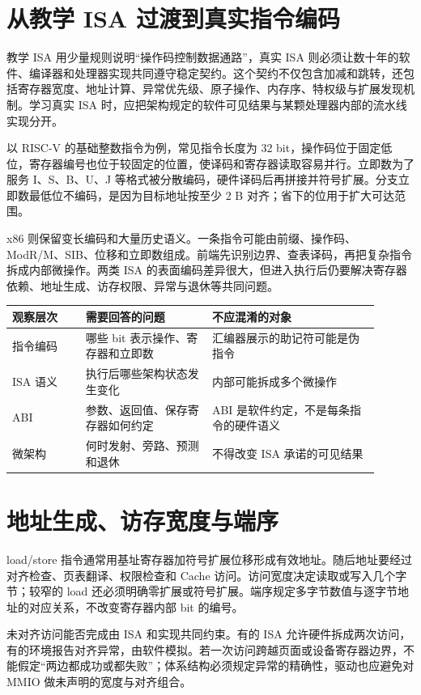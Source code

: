 \section{从教学 ISA 过渡到真实指令编码}

教学 ISA 用少量规则说明“操作码控制数据通路”，真实 ISA 则必须让数十年的软件、编译器和处理器实现共同遵守稳定契约。这个契约不仅包含加减和跳转，还包括寄存器宽度、地址计算、异常优先级、原子操作、内存序、特权级与扩展发现机制。学习真实 ISA 时，应把架构规定的软件可见结果与某颗处理器内部的流水线实现分开。

以 RISC-V 的基础整数指令为例，常见指令长度为 32 bit，操作码位于固定低位，寄存器编号也位于较固定的位置，使译码和寄存器读取容易并行。立即数为了服务 I、S、B、U、J 等格式被分散编码，硬件译码后再拼接并符号扩展。分支立即数最低位不编码，是因为目标地址按至少 2 B 对齐；省下的位用于扩大可达范围。

x86 则保留变长编码和大量历史语义。一条指令可能由前缀、操作码、ModR/M、SIB、位移和立即数组成。前端先识别边界、查表译码，再把复杂指令拆成内部微操作。两类 ISA 的表面编码差异很大，但进入执行后仍要解决寄存器依赖、地址生成、访存权限、异常与退休等共同问题。

\begin{longtable}{L{0.18\linewidth}L{0.31\linewidth}L{0.41\linewidth}}
\toprule
观察层次 & 需要回答的问题 & 不应混淆的对象 \\
\midrule
指令编码 & 哪些 bit 表示操作、寄存器和立即数 & 汇编器展示的助记符可能是伪指令 \\
ISA 语义 & 执行后哪些架构状态发生变化 & 内部可能拆成多个微操作 \\
ABI & 参数、返回值、保存寄存器如何约定 & ABI 是软件约定，不是每条指令的硬件语义 \\
微架构 & 何时发射、旁路、预测和退休 & 不得改变 ISA 承诺的可见结果 \\
\bottomrule
\end{longtable}

\section{地址生成、访存宽度与端序}

load/store 指令通常用基址寄存器加符号扩展位移形成有效地址。随后地址要经过对齐检查、页表翻译、权限检查和 Cache 访问。访问宽度决定读取或写入几个字节；较窄的 load 还必须明确零扩展或符号扩展。端序规定多字节数值与逐字节地址的对应关系，不改变寄存器内部 bit 的编号。

未对齐访问能否完成由 ISA 和实现共同约束。有的 ISA 允许硬件拆成两次访问，有的环境报告对齐异常，由软件模拟。若一次访问跨越页面或设备寄存器边界，不能假定“两边都成功或都失败”；体系结构必须规定异常的精确性，驱动也应避免对 MMIO 做未声明的宽度与对齐组合。

